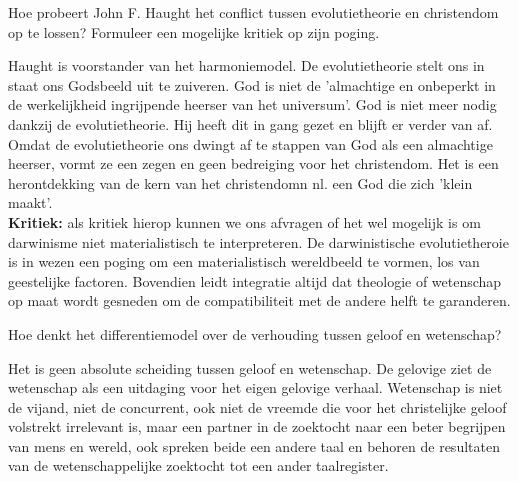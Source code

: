 \documentclass[main.tex]{subfiles}
\begin{document}
\begin{examenvraag}
    \begin{vraag}
        Hoe probeert John F. Haught het conflict tussen evolutietheorie en christendom op te lossen? Formuleer een mogelijke kritiek op zijn poging.
    \end{vraag}

    \begin{antwoord}
		Haught is voorstander van het harmoniemodel.
			De evolutietheorie stelt ons in staat ons Godsbeeld uit te zuiveren. God is niet de 'almachtige en onbeperkt in de werkelijkheid ingrijpende heerser van het universum'. God is niet meer nodig dankzij de evolutietheorie. Hij heeft dit in gang gezet en blijft er verder van af. Omdat de evolutietheorie ons dwingt af te stappen van God als een almachtige heerser, vormt ze een zegen en geen bedreiging voor het christendom. Het is een herontdekking van de kern van het christendomn nl. een God die zich 'klein maakt'.\\
			
			\textbf{Kritiek:} als kritiek hierop kunnen we ons afvragen of 
			het wel 
			mogelijk is om darwinisme niet materialistisch te interpreteren.‭ 
			‬De darwinistische evolutietheroie is in wezen een poging om een 
			materialistisch wereldbeeld te vormen,‭ ‬los van geestelijke 
			factoren.‭ ‬Bovendien leidt integratie altijd dat theologie of 
			wetenschap op maat wordt gesneden om de compatibiliteit met de 
			andere helft te garanderen.
    \end{antwoord}
\end{examenvraag}


\begin{examenvraag}
    \begin{vraag}
    Hoe denkt het differentiemodel over de verhouding tussen geloof en wetenschap?
    \end{vraag}

    \begin{antwoord}
    	Het is geen absolute scheiding tussen geloof en wetenschap. De gelovige ziet de wetenschap als een uitdaging voor het eigen gelovige verhaal. Wetenschap is niet de vijand, niet de concurrent, ook niet de vreemde die voor het christelijke geloof volstrekt irrelevant is, maar een partner in de zoektocht naar een beter begrijpen van mens en wereld, ook spreken beide een andere taal en behoren de resultaten van de wetenschappelijke zoektocht tot een ander taalregister.
    \end{antwoord}
\end{examenvraag}
\end{document}
